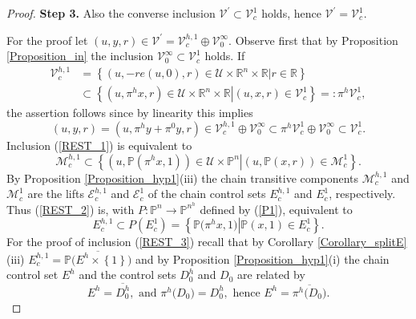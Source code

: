 \documentclass{siamltex}%
\begin{document}
\begin{proof}
\textbf{Step 3. }Also the converse inclusion $\mathcal{V}^{\prime}%
\subset\mathcal{V}_{c}^{1}$ holds, hence $\mathcal{V}^{\prime}=\mathcal{V}%
_{c}^{1}$.

For the proof let $(u,y,r)\in\mathcal{V}^{\prime}=\mathcal{V}_{c}^{h,1}%
\oplus\mathcal{V}_{0}^{\infty}$. Observe first that by Proposition
\ref{Proposition_in} the inclusion $\mathcal{V}_{0}^{\infty}\subset
\mathcal{V}_{c}^{1}$ holds. If%
\begin{align}
\mathcal{V}_{c}^{h,1}  &  =\left\{  (u,-re(u,0),r)\in\mathcal{U}%
\times\mathbb{R}^{n}\times\mathbb{R}\left\vert r\in\mathbb{R}\right.  \right\}
\nonumber\\
&  \subset\left\{  (u,\pi^{h}x,r)\in\mathcal{U}\times\mathbb{R}^{n}%
\times\mathbb{R}\left\vert (u,x,r)\in\mathcal{V}_{c}^{1}\right.  \right\}
=:\pi^{h}\mathcal{V}_{c}^{1}, \label{REST_1}%
\end{align}
the assertion follows since by linearity this implies%
\[
(u,y,r)=(u,\pi^{h}y+\pi^{0}y,r)\in\mathcal{V}_{c}^{h,1}\oplus\mathcal{V}%
_{0}^{\infty}\subset\pi^{h}\mathcal{V}_{c}^{1}\oplus\mathcal{V}_{0}^{\infty
}\subset\mathcal{V}_{c}^{1}.
\]
Inclusion (\ref{REST_1}) is equivalent to
\begin{equation}
\mathcal{M}_{c}^{h,1}\subset\left\{  (u,\mathbb{P}\left(  \pi^{h}x,1\right)
)\in\mathcal{U}\times\mathbb{P}^{n}\left\vert (u,\mathbb{P}\left(  x,r\right)
)\in\mathcal{M}_{c}^{1}\right.  \right\}  . \label{REST_2}%
\end{equation}
By Proposition \ref{Proposition_hyp1}(iii) the chain transitive components
$\mathcal{M}_{c}^{h,1}$ and $\mathcal{M}_{c}^{1}$ are the lifts $\mathcal{E}%
_{c}^{h,1}$ and $\mathcal{E}_{c}^{1}$ of the chain control sets $E_{c}^{h,1}$
and $E_{c}^{1}$, respectively. Thus (\ref{REST_2}) is, with $P:\mathbb{P}%
^{n}\rightarrow\mathbb{P}^{n^{h}}$ defined by (\ref{P1}), equivalent to%
\begin{equation}
E_{c}^{h,1}\subset P(E_{c}^{1})=\left\{  \mathbb{P(}\pi^{h}x,1)\left\vert
\mathbb{P}(x,1)\in E_{c}^{1}\right.  \right\}  . \label{REST_3}%
\end{equation}
For the proof of inclusion (\ref{REST_3}) recall that by Corollary
\ref{Corollary_splitE}(iii) $E_{c}^{h,1}=\overline{\mathbb{P(}E^{h}%
\times\left\{  1\right\}  )}$ and by Proposition \ref{Proposition_hyp1}(i) the
chain control set $E^{h}$ and the control sets $D_{0}^{h}$ and $D_{0}$ are
related by%
\[
E^{h}=\overline{D_{0}^{h}},\text{ and }\pi^{h}(D_{0}\mathbb{)}=D_{0}%
^{h},\text{ hence }E^{h}=\overline{\pi^{h}(D_{0}\mathbb{)}}.
\]
\end{proof}
\end{document}

